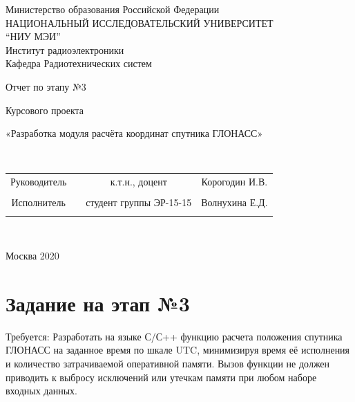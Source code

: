 \documentclass[]{article}
\begin{document}
\begin{center}
	\hfill \break
	\large{Министерство образования Российской Федерации}\\
	\large{НАЦИОНАЛЬНЫЙ ИССЛЕДОВАТЕЛЬСКИЙ УНИВЕРСИТЕТ}\\ 
	\large{“НИУ МЭИ”}\\

	\hfill \break
	\normalsize{Институт радиоэлектроники}\\
	\hfill \break
	\normalsize{Кафедра Радиотехнических систем}\\
	\hfill\break
	\hfill \break
	\hfill \break
	\hfill \break
	\large{Отчет по этапу №3
		
		Курсового проекта
		 
		«Разработка модуля расчёта координат спутника ГЛОНАСС»	}\\
	\hfill \break
	\hfill \break
	\hfill \break
	
		\hfill \break
	
		\hfill \break
	
	\hfill \break
	\hfill \break
\end{center}

\hfill \break
\hfill \break

\normalsize{ 
	\begin{tabular}{cccc}
		
	
		Руководитель & \underline{\hspace{3cm}}& к.т.н., доцент & Корогодин И.В. \\\\
		
		Исполнитель & \underline{\hspace{3cm}} &студент группы ЭР-15-15 &Волнухина Е.Д. \\\\
	\end{tabular}
}\\
\hfill \break
\hfill \break
\begin{center} Москва 2020 \end{center}
\thispagestyle{empty} %

\tableofcontents


\newpage
\section{Задание на этап №3}
Требуется:
Разработать на языке С/С++ функцию расчета положения спутника ГЛОНАСС на заданное время по шкале UTC, минимизируя время её исполнения и количество затрачиваемой оперативной памяти. Вызов функции не должен приводить к выбросу исключений или утечкам памяти при любом наборе входных данных.
\end{document}
